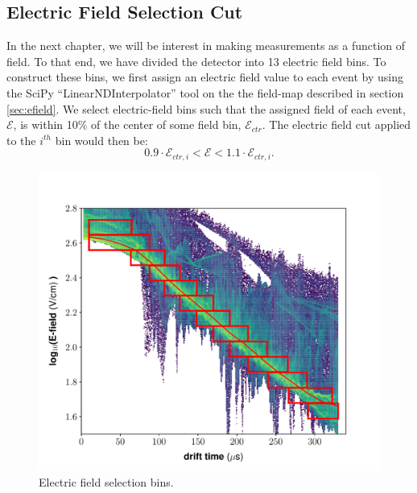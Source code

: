 \subsection{Electric Field Selection Cut}\label{sec:fieldbins}
In the next chapter, we will be interest in making measurements as a function of field. To that end, we have divided the detector into 13 electric field bins. To construct these bins, we first assign an electric field value to each event by using the SciPy ``LinearNDInterpolator'' tool\cite{scipy} on the the field-map described in section \ref{sec:efield}. We select electric-field bins such that the assigned field of each event, $\mathcal{E}$, is within 10\% of the center of some field bin, $\mathcal{E}_{ctr}$. The electric field cut applied to the  $i^{th}$ bin would then be:
\begin{equation}\label{eq:ebin_e}
0.9\cdot \mathcal{E}_{ctr,i}< \mathcal{E} < 1.1\cdot \mathcal{E}_{ctr,i}.
\end{equation}
\begin{figure}[h!]
\centering
\includegraphics[width=\textwidth]{Figures/field_cut.pdf}
\caption{Electric field selection bins. } 
\label{fig:fieldbins}
\end{figure}

